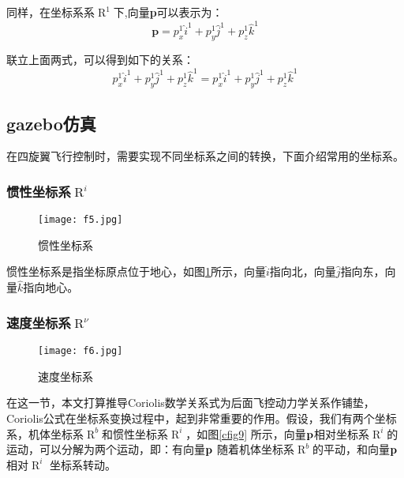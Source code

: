 同样，在坐标系系$\mathop R\nolimits^1 $下,向量{\bf{p}}可以表示为：
%
\begin{equation}
\mathbf{p} = p_{x}^{1} \hat{i}^1 + p_{y}^{1} \hat{j}^1 + p_{z}^{1} \hat{k}^1
\end{equation}

联立上面两式，可以得到如下的关系：
%
\begin{equation}
p_{x}^{1} \hat{i}^1 + p_{y}^{1} \hat{j}^1 + p_{z}^{1} \hat{k}^1 = p_{x}^{1} \hat{i}^1 + p_{y}^{1} \hat{j}^1 + p_{z}^{1} \hat{k}^1
\end{equation}



\subsection{gazebo仿真} \label{2.1.2}

在四旋翼飞行控制时，需要实现不同坐标系之间的转换，下面介绍常用的坐标系。

\subsubsection{惯性坐标系$\mathop R\nolimits^i $}

\begin{figure}[!ht]
\centering
\texttt{[image: f5.jpg]}
\caption{惯性坐标系}
\label{fig4}
\end{figure}

惯性坐标系是指坐标原点位于地心，如图\ref{fig4}所示，向量$\hat i$指向北，向量$\hat j$指向东，向量$\hat k$指向地心。

\subsubsection{速度坐标系$\mathop R\nolimits^\nu$}

\begin{figure}[!ht]
\centering
\texttt{[image: f6.jpg]}
\caption{速度坐标系}
\label{fig5}
\end{figure}



在这一节，本文打算推导Coriolis数学关系式为后面飞控动力学关系作铺垫，Coriolis公式在坐标系变换过程中，起到非常重要的作用。假设，我们有两个坐标系，机体坐标系$\mathop R\nolimits^b $和惯性坐标系$\mathop R\nolimits^i $，如图\ref{cfig9} 所示，向量${\bf{p}}$相对坐标系$\mathop R\nolimits^i $的运动，可以分解为两个运动，即：有向量${\bf{p}}$ 随着机体坐标系$\mathop R\nolimits^b $的平动，和向量${\bf{p}}$相对$\mathop R\nolimits^i $ 坐标系转动。

